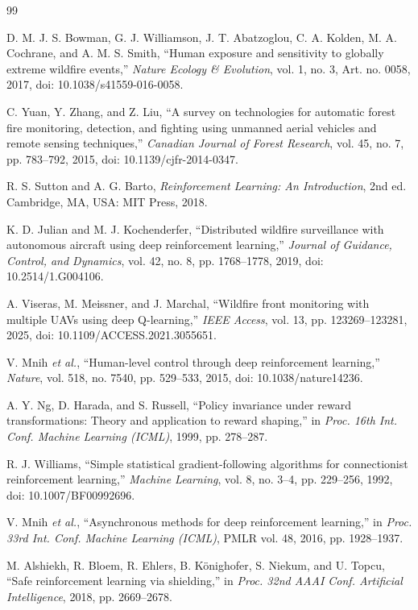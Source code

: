 \begin{thebibliography}{99}

D. M. J. S. Bowman, G. J. Williamson, J. T. Abatzoglou, C. A. Kolden, M. A. Cochrane, and
A. M. S. Smith, ``Human exposure and sensitivity to globally extreme wildfire events,''
\emph{Nature Ecology \& Evolution}, vol. 1, no. 3, Art. no. 0058, 2017,
doi: 10.1038/s41559-016-0058.

C. Yuan, Y. Zhang, and Z. Liu, ``A survey on technologies for automatic forest fire
monitoring, detection, and fighting using unmanned aerial vehicles and remote sensing
techniques,'' \emph{Canadian Journal of Forest Research}, vol. 45, no. 7, pp. 783--792, 2015,
doi: 10.1139/cjfr-2014-0347.

R. S. Sutton and A. G. Barto, \emph{Reinforcement Learning: An Introduction}, 2nd ed.
Cambridge, MA, USA: MIT Press, 2018.

K. D. Julian and M. J. Kochenderfer, ``Distributed wildfire surveillance with autonomous
aircraft using deep reinforcement learning,'' \emph{Journal of Guidance, Control, and
Dynamics}, vol. 42, no. 8, pp. 1768--1778, 2019, doi: 10.2514/1.G004106.

A. Viseras, M. Meissner, and J. Marchal, ``Wildfire front monitoring with multiple UAVs using
deep Q-learning,'' \emph{IEEE Access}, vol. 13, pp. 123269--123281, 2025,
doi: 10.1109/ACCESS.2021.3055651.

V. Mnih \emph{et al.}, ``Human-level control through deep reinforcement learning,''
\emph{Nature}, vol. 518, no. 7540, pp. 529--533, 2015, doi: 10.1038/nature14236.

A. Y. Ng, D. Harada, and S. Russell, ``Policy invariance under reward transformations: Theory
and application to reward shaping,'' in \emph{Proc. 16th Int. Conf. Machine Learning (ICML)},
1999, pp. 278--287.

R. J. Williams, ``Simple statistical gradient-following algorithms for connectionist
reinforcement learning,'' \emph{Machine Learning}, vol. 8, no. 3--4, pp. 229--256, 1992,
doi: 10.1007/BF00992696.

V. Mnih \emph{et al.}, ``Asynchronous methods for deep reinforcement learning,'' in
\emph{Proc. 33rd Int. Conf. Machine Learning (ICML)}, PMLR vol. 48, 2016, pp. 1928--1937.

M. Alshiekh, R. Bloem, R. Ehlers, B. K\"{o}nighofer, S. Niekum, and U. Topcu, ``Safe
reinforcement learning via shielding,'' in \emph{Proc. 32nd AAAI Conf. Artificial
Intelligence}, 2018, pp. 2669--2678.


\end{thebibliography}
